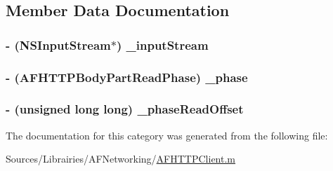 \subsection{Member Data Documentation}
\hypertarget{category_a_f_h_t_t_p_body_part_07_08_a3ff59819a038e5b89a041b6e59b9f858}{
\subsubsection[{\-\_\-input\-Stream}]{\setlength{\rightskip}{0pt plus 5cm}-\/ (N\-S\-Input\-Stream$\ast$) \-\_\-input\-Stream\hspace{0.3cm}{\ttfamily [protected]}}}\label{category_a_f_h_t_t_p_body_part_07_08_a3ff59819a038e5b89a041b6e59b9f858}
\hypertarget{category_a_f_h_t_t_p_body_part_07_08_a9e462f49c6b01eb159ee18e4dfa9f2dc}{
\subsubsection[{\-\_\-phase}]{\setlength{\rightskip}{0pt plus 5cm}-\/ ({\bf A\-F\-H\-T\-T\-P\-Body\-Part\-Read\-Phase}) \-\_\-phase\hspace{0.3cm}{\ttfamily [protected]}}}\label{category_a_f_h_t_t_p_body_part_07_08_a9e462f49c6b01eb159ee18e4dfa9f2dc}
\hypertarget{category_a_f_h_t_t_p_body_part_07_08_ab23d067a3e044b62a837e737042cd721}{
\subsubsection[{\-\_\-phase\-Read\-Offset}]{\setlength{\rightskip}{0pt plus 5cm}-\/ (unsigned long long) \-\_\-phase\-Read\-Offset\hspace{0.3cm}{\ttfamily [protected]}}}\label{category_a_f_h_t_t_p_body_part_07_08_ab23d067a3e044b62a837e737042cd721}


The documentation for this category was generated from the following file\-:\begin{DoxyCompactItemize}
\item 
Sources/\-Librairies/\-A\-F\-Networking/\hyperlink{_a_f_h_t_t_p_client_8m}{A\-F\-H\-T\-T\-P\-Client.\-m}\end{DoxyCompactItemize}
